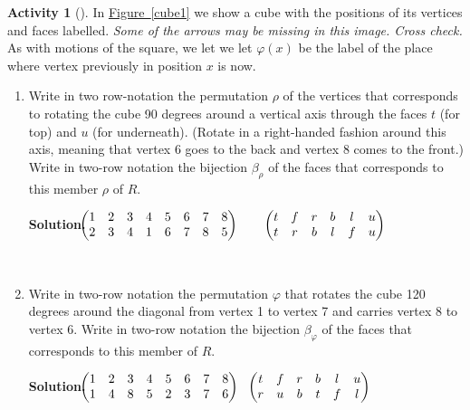 \documentclass[10pt,]{book}
\theoremstyle{plain}
\theoremstyle{definition}
\newtheorem{activity}[project]{Activity}
\numberwithin{equation}{chapter}
\newcommand{\amp}{&}
\begin{document}
\begin{activity}[]\label{activity-263}
In \hyperref[cube1]{Figure~\ref{cube1}} we show a cube with the positions of its vertices and faces labelled. \emph{Some of the arrows may be missing in this image. Cross check.} As with motions of the square, we let we let \(\varphi(x)\) be the label of the place where vertex previously in position \(x\) is now.%
~\par
\begin{enumerate}[label=(\alph*)]
 \item Write in two row-notation the permutation \(\rho\) of the vertices that corresponds to rotating the cube 90 degrees around a vertical axis through the faces \(t\) (for top) and \(u\) (for underneath).  (Rotate in a right-handed fashion around this axis, meaning that vertex 6 goes to the back and vertex 8 comes to the front.)  Write in two-row notation the bijection \(\beta_{\rho}\) of the faces that corresponds to this member \(\rho\) of \(R\).%
\par\medskip\noindent%
\textbf{Solution.}\quad \(\!\!\!\begin{pmatrix}1\amp 2\amp 3\amp 4\amp 5\amp 6\amp 7\amp 8\cr
2\amp 3\amp 4\amp 1\amp 6\amp 7\amp 8\amp 5
\end{pmatrix}\)~~~~\(\begin{pmatrix}t\amp f\amp r\amp b\amp l\amp u\cr t\amp r\amp b\amp l\amp f\amp u
\end{pmatrix}\)%

~\par
\item Write in two-row notation the permutation \(\varphi\) that rotates the cube 120 degrees around the diagonal from vertex 1 to vertex 7 and carries vertex 8 to vertex 6.  Write in two-row notation the bijection \(\beta_\varphi\) of the faces that corresponds to this member of \(R\).%
\par\medskip\noindent%
\textbf{Solution.}\quad \(\!\!\!\begin{pmatrix}1\amp 2\amp 3\amp 4\amp 5\amp 6\amp 7\amp 8\cr1\amp 4\amp 8\amp 5\amp 2\amp 3\amp 7\amp 6
\end{pmatrix} ~
~\begin{pmatrix}t\amp f\amp r\amp b\amp l\amp u\cr r\amp u\amp b\amp t\amp f\amp l
\end{pmatrix}\)%


\end{enumerate}
\end{activity}
\end{document}
